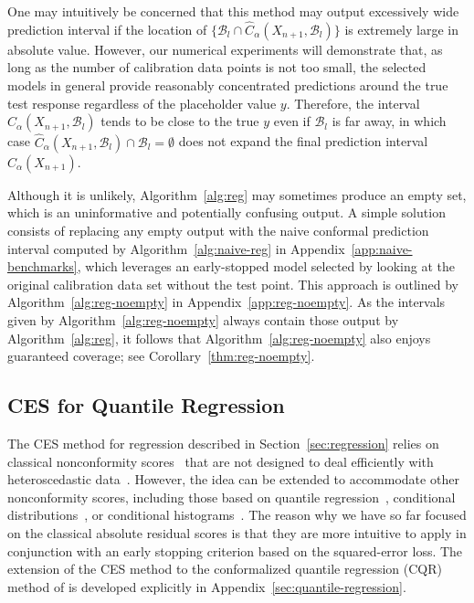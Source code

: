 One may intuitively be concerned that this method may output excessively wide prediction interval if the location of $\{\mathcal{B}_l \cap \hat{C}_\alpha(X_{n+1}, \mathcal{B}_l)\}$ is extremely large in absolute value.
However, our numerical experiments will demonstrate that, as long as the number of calibration data points is not too small, the selected models in general provide reasonably concentrated predictions around the true test response regardless of the placeholder value $y$. Therefore, the interval $\hat{C}_\alpha(X_{n+1}, \mathcal{B}_l)$ tends to be close to the true $y$ even if $\mathcal{B}_l$ is far away, in which case $\hat{C}_\alpha(X_{n+1}, \mathcal{B}_l) \cap \mathcal{B}_l = \emptyset$ does not expand the final prediction interval $\hat{C}_\alpha(X_{n+1})$.


Although it is unlikely, Algorithm~\ref{alg:reg} may sometimes produce an empty set, which is an uninformative and potentially confusing output. A simple solution consists of replacing any empty output with the naive conformal prediction interval computed by Algorithm~\ref{alg:naive-reg} in Appendix~\ref{app:naive-benchmarks}, which leverages an early-stopped model selected by looking at the original calibration data set without the test point.
This approach is outlined by Algorithm~\ref{alg:reg-noempty} in Appendix~\ref{app:reg-noempty}.
As the intervals given by Algorithm~\ref{alg:reg-noempty} always contain those output by Algorithm~\ref{alg:reg}, it follows that Algorithm~\ref{alg:reg-noempty} also enjoys guaranteed coverage; see Corollary~\ref{thm:reg-noempty}.


\subsection{CES for Quantile Regression} \label{sec:regression-cqr-short}

The CES method for regression described in Section~\ref{sec:regression} relies on classical nonconformity scores~\cite{vovk2005algorithmic,lei2016RegressionPS} that are not designed to deal efficiently with heteroscedastic data~\cite{romano2019conformalized,sesia2020comparison}.
However, the idea can be extended to accommodate other nonconformity scores, including those based on quantile regression~\cite{romano2019conformalized}, conditional distributions~\cite{izbicki2019flexible, chernozhukov2019distributional}, or conditional histograms~\cite{sesia2021conformal}.
The reason why we have so far focused on the classical absolute residual scores is that they are more intuitive to apply in conjunction with an early stopping criterion based on the squared-error loss.
The extension of the CES method to the conformalized quantile regression (CQR) method of \citet{romano2019conformalized} is developed explicitly in Appendix~\ref{sec:quantile-regression}.


